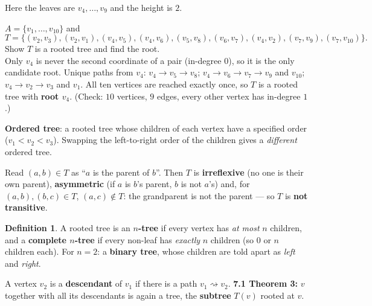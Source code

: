 \documentclass{fkt-notes}
\theoremstyle{definition}
\newtheorem*{defn}{Definition}
\begin{document}
\begin{center}
\end{center}
Here the leaves are $v_4,\dots,v_9$ and the height is $2$.

\begin{example}
  $A=\{v_1,\dots,v_{10}\}$ and
  \[
    T=\{(v_2,v_3),(v_2,v_1),(v_4,v_5),(v_4,v_6),(v_5,v_8),(v_6,v_7),
    (v_4,v_2),(v_7,v_9),(v_7,v_{10})\}.
  \]
  Show $T$ is a rooted tree and find the root.\\
  Only $v_4$ is never the second coordinate of a pair (in-degree $0$), so
  it is the only candidate root. Unique paths from $v_4$:
  $v_4\to v_5\to v_8$; $v_4\to v_6\to v_7\to v_9$ and $v_{10}$;
  $v_4\to v_2\to v_3$ and $v_1$. All ten vertices are reached exactly
  once, so $T$ is a rooted tree with \textbf{root $v_4$}. (Check: $10$
  vertices, $9$ edges, every other vertex has in-degree $1$.)
\end{example}

\textbf{Ordered tree}: a rooted tree whose children of each vertex have a
specified order ($v_1<v_2<v_3$). Swapping the left-to-right order of the
children gives a \emph{different} ordered tree.

\begin{rulebox}[title={7.1 Theorem 2: a tree is like a parent relation}]
  Read $(a,b)\in T$ as ``$a$ is the parent of $b$''. Then $T$ is
  \textbf{irreflexive} (no one is their own parent), \textbf{asymmetric}
  (if $a$ is $b$'s parent, $b$ is not $a$'s) and, for $(a,b),(b,c)\in T$,
  $(a,c)\notin T$: the grandparent is not the parent --- so $T$ is
  \textbf{not transitive}.
\end{rulebox}

\begin{defn}
  A rooted tree is an \textbf{$n$-tree} if every vertex has \emph{at most}
  $n$ children, and a \textbf{complete $n$-tree} if every non-leaf has
  \emph{exactly} $n$ children (so $0$ or $n$ children each). For $n=2$:
  a \textbf{binary tree}, whose children are told apart as \emph{left} and
  \emph{right}.
\end{defn}
A vertex $v_2$ is a \textbf{descendant} of $v_1$ if there is a path
$v_1\rightsquigarrow v_2$. \textbf{7.1 Theorem 3:} $v$ together with all
its descendants is again a tree, the \textbf{subtree} $T(v)$ rooted at
$v$.
\end{document}
